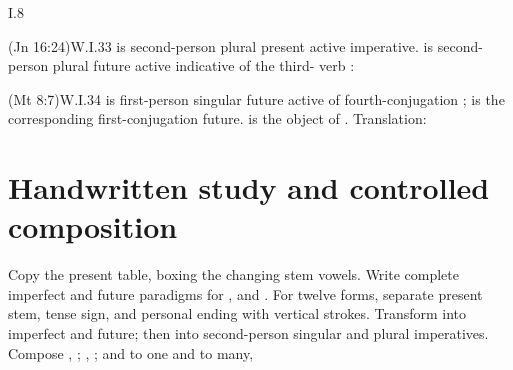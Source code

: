 \begin{courseunit}{I.8}
\begin{workedexample}{ (Jn 16:24)}{W.I.33}
 is second-person plural present active imperative.
 is second-person plural future active indicative of the
third- verb : 
\end{workedexample}

\begin{workedexample}{ (Mt 8:7)}{W.I.34}
 is first-person singular future active of fourth-conjugation
;  is the corresponding first-conjugation future.
 is the object of . Translation: 
\end{workedexample}

\section{Handwritten study and controlled composition}

Copy the present table, boxing the changing stem vowels. Write complete
imperfect and future paradigms for , and .
For twelve forms, separate present stem, tense sign, and personal ending with
vertical strokes. Transform  into imperfect and future;
then into second-person singular and plural imperatives. Compose
, ;
, ; and
 to one and to many,



\end{courseunit}

